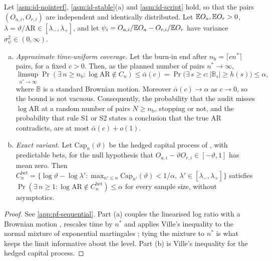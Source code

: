 \begin{theorem}\label{thm:sequential}
Let \cref{asm:id-nointerf}, \cref{asm:id-stable}(a) and \cref{asm:id-script} hold, so that the pairs $(O_{a,i},O_{r,i})$ are independent and identically distributed. Let $\mathbb{E} O_a,\mathbb{E} O_r>0$, $\lambda=\vartheta/\mathrm{AR}\in[\lambda_-,\lambda_+]$, and let $\psi_i=O_{a,i}/\mathbb{E} O_a-O_{r,i}/\mathbb{E} O_r$ have variance $\sigma^2_\psi\in(0,\infty)$.
\begin{enumerate}[(a)]
  \item \emph{Approximate time-uniform coverage.} Let the burn-in end after $n_{\mathrm b}=\lceil cn^\ast\rceil$ pairs, for a fixed $c>0$. Then, as the planned number of pairs $n^\ast\to\infty$,
  \[
    \limsup_{n^\ast\to\infty}\Pr(\exists\,n\ge n_{\mathrm b}:\log\mathrm{AR}\notin C_n)\le\bar\alpha(c)=\Pr\bigl(\exists\,s\ge c:|\mathbb B_s|\ge h(s)\bigr)\le\alpha,
  \]
  where $\mathbb B$ is a standard Brownian motion. Moreover $\bar\alpha(c)\to\alpha$ as $c\to0$, so the bound is not vacuous. Consequently, the probability that the audit misses $\log\mathrm{AR}$ at a random number of pairs $N\ge n_{\mathrm b}$, stopping or not, and the probability that rule S1 or S2 states a conclusion that the true $\mathrm{AR}$ contradicts, are at most $\bar\alpha(c)+o(1)$.
  \item \emph{Exact variant.} Let $\mathrm{Cap}_n(\vartheta)$ be the hedged capital process of \citet{waudbysmith2024betting}, with predictable bets, for the null hypothesis that $O_{a,i}-\vartheta O_{r,i}\in[-\vartheta,1]$ has mean zero. Then $C^{\mathrm{bet}}_n=\{\log\vartheta-\log\lambda':\max_{n'\le n}\mathrm{Cap}_{n'}(\vartheta)<1/\alpha,\ \lambda'\in[\lambda_-,\lambda_+]\}$ satisfies $\Pr(\exists\,n\ge1:\log\mathrm{AR}\notin C^{\mathrm{bet}}_n)\le\alpha$ for every sample size, without asymptotics.
\end{enumerate}
\end{theorem}

\begin{proof}See \cref{app:pf-sequential}. Part (a) couples the linearised log ratio with a Brownian motion \citep{komlos1975,komlos1976}, rescales time by $n^\ast$ and applies Ville's inequality to the normal mixture of exponential martingales \citep{robbins1970}; tying the mixture to $n^\ast$ is what keeps the limit informative about the level. Part (b) is Ville's inequality for the hedged capital process.\end{proof}

